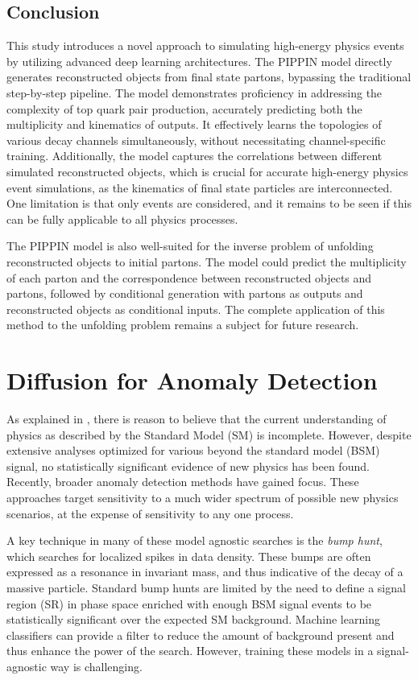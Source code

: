 \FloatBarrier

\subsection{Conclusion}

This study introduces a novel approach to simulating high-energy physics events by utilizing advanced deep learning architectures.
The PIPPIN model directly generates reconstructed objects from final state partons, bypassing the traditional step-by-step pipeline.
The model demonstrates proficiency in addressing the complexity of top quark pair production, accurately predicting both the multiplicity and kinematics of outputs.
It effectively learns the topologies of various decay channels simultaneously, without necessitating channel-specific training.
Additionally, the model captures the correlations between different simulated reconstructed objects, which is crucial for accurate high-energy physics event simulations, as the kinematics of final state particles are interconnected.
One limitation is that only \ttbar events are considered, and it remains to be seen if this can be fully applicable to all physics processes.

The PIPPIN model is also well-suited for the inverse problem of unfolding reconstructed objects to initial partons.
The model could predict the multiplicity of each parton and the correspondence between reconstructed objects and partons, followed by conditional generation with partons as outputs and reconstructed objects as conditional inputs.
The complete application of this method to the unfolding problem remains a subject for future research.

\section{Diffusion for Anomaly Detection}
\label{sec:drapes}

As explained in , there is reason to believe that the current understanding of physics as described by the Standard Model (SM) is incomplete.
However, despite extensive analyses optimized for various beyond the standard model (BSM) signal, no statistically significant evidence of new physics has been found.
Recently, broader anomaly detection methods have gained focus.
These approaches target sensitivity to a much wider spectrum of possible new physics scenarios, at the expense of sensitivity to any one process.

A key technique in many of these model agnostic searches is the \textit{bump hunt}, which searches for localized spikes in data density.
These bumps are often expressed as a resonance in invariant mass, and thus indicative of the decay of a massive particle.
Standard bump hunts are limited by the need to define a signal region (SR) in phase space enriched with enough BSM signal events to be statistically significant over the expected SM background.
Machine learning classifiers can provide a filter to reduce the amount of background present and thus enhance the power of the search.
However, training these models in a signal-agnostic way is challenging.

